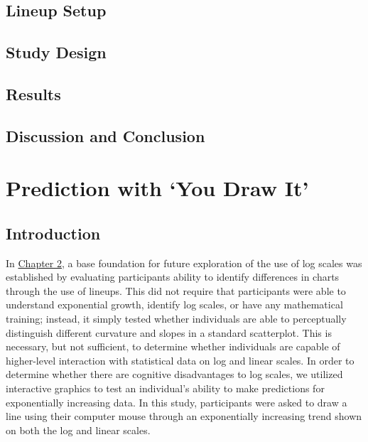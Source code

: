 \documentclass[print]{nuthesis}
\begin{document}
\hypertarget{lineup-setup}{%
\section{Lineup Setup}\label{lineup-setup}}

\hypertarget{study-design}{%
\section{Study Design}\label{study-design}}

\hypertarget{results}{%
\section{Results}\label{results}}

\hypertarget{discussion-and-conclusion}{%
\section{Discussion and Conclusion}\label{discussion-and-conclusion}}

\hypertarget{youdrawit}{%
\chapter{Prediction with `You Draw It'}\label{youdrawit}}

\hypertarget{introduction-1}{%
\section{Introduction}\label{introduction-1}}

In \protect\hyperlink{lineups}{Chapter 2}, a base foundation for future exploration of the use of log scales was established by evaluating participants ability to identify differences in charts through the use of lineups.
This did not require that participants were able to understand exponential growth, identify log scales, or have any mathematical training; instead, it simply tested whether individuals are able to perceptually distinguish different curvature and slopes in a standard scatterplot.
This is necessary, but not sufficient, to determine whether individuals are capable of higher-level interaction with statistical data on log and linear scales.
In order to determine whether there are cognitive disadvantages to log scales, we utilized interactive graphics to test an individual's ability to make predictions for exponentially increasing data.
In this study, participants were asked to draw a line using their computer mouse through an exponentially increasing trend shown on both the log and linear scales.
\end{document}
